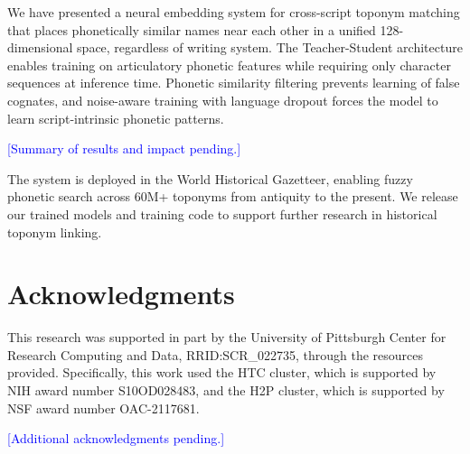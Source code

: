 \documentclass[11pt,a4paper]{article}
\newcommand{\placeholder}[1]{\textcolor{blue}{[#1]}}
\newcommand{\embdim}{128}
\begin{document}
We have presented a neural embedding system for cross-script toponym matching that places phonetically similar names near each other in a unified \embdim-dimensional space, regardless of writing system. The Teacher-Student architecture enables training on articulatory phonetic features while requiring only character sequences at inference time. Phonetic similarity filtering prevents learning of false cognates, and noise-aware training with language dropout forces the model to learn script-intrinsic phonetic patterns.

\placeholder{Summary of results and impact pending.}

The system is deployed in the World Historical Gazetteer, enabling fuzzy phonetic search across 60M+ toponyms from antiquity to the present. We release our trained models and training code to support further research in historical toponym linking.


\section*{Acknowledgments}

This research was supported in part by the University of Pittsburgh Center for Research Computing and Data, RRID:SCR\_022735, through the resources provided. Specifically, this work used the HTC cluster, which is supported by NIH award number S10OD028483, and the H2P cluster, which is supported by NSF award number OAC-2117681.

\placeholder{Additional acknowledgments pending.}




\end{document}
